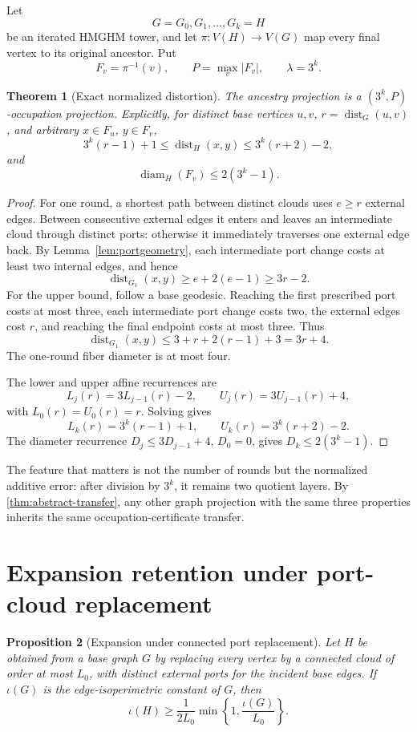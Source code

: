 \documentclass[11pt]{amsart}
\newtheorem{theorem}{Theorem}[section]
\newtheorem{proposition}[theorem]{Proposition}
\theoremstyle{definition}
\newcommand{\dist}{\operatorname{dist}}
\newcommand{\diam}{\operatorname{diam}}
\newcommand{\iotae}{\iota}
\begin{document}
Let
\[
 G=G_0,G_1,\ldots,G_k=H
\]
be an iterated HMGHM tower, and let $\pi:V(H)\to V(G)$ map every final vertex
to its original ancestor.  Put
\[
 F_v=\pi^{-1}(v),
 \qquad
 P=\max_v|F_v|,
 \qquad
 \lambda=3^k.
\]

\begin{theorem}[Exact normalized distortion]\label{thm:metric}
The ancestry projection is a $(3^k,P)$-occupation projection.  Explicitly,
for distinct base vertices $u,v$, $r=\dist_G(u,v)$, and arbitrary
$x\in F_u$, $y\in F_v$,
\[
 \boxed{
 3^k(r-1)+1
 \le
 \dist_H(x,y)
 \le
 3^k(r+2)-2,
 }
\]
and
\[
 \boxed{\diam_H(F_v)\le2(3^k-1).}
\]
\end{theorem}

\begin{proof}
For one round, a shortest path between distinct clouds uses $e\ge r$
external edges.  Between consecutive external edges it enters and leaves an
intermediate cloud through distinct ports: otherwise it immediately traverses
one external edge back.  By Lemma~\ref{lem:portgeometry}, each intermediate port
change costs at least two internal edges, and hence
\[
 \dist_{G_1}(x,y)\ge e+2(e-1)\ge3r-2.
\]
For the upper bound, follow a base geodesic.  Reaching the first prescribed
port costs at most three, each intermediate port change costs two, the
external edges cost $r$, and reaching the final endpoint costs at most three.
Thus
\[
 \dist_{G_1}(x,y)\le3+r+2(r-1)+3=3r+4.
\]
The one-round fiber diameter is at most four.

The lower and upper affine recurrences are
\[
 L_j(r)=3L_{j-1}(r)-2,
 \qquad
 U_j(r)=3U_{j-1}(r)+4,
\]
with $L_0(r)=U_0(r)=r$.  Solving gives
\[
 L_k(r)=3^k(r-1)+1,
 \qquad
 U_k(r)=3^k(r+2)-2.
\]
The diameter recurrence $D_j\le3D_{j-1}+4$, $D_0=0$, gives
$D_k\le2(3^k-1)$.
\end{proof}

The feature that matters is not the number of rounds but the normalized
additive error: after division by $3^k$, it remains two quotient layers.  By
\cref{thm:abstract-transfer}, any other graph projection with the same three
properties inherits the same occupation-certificate transfer.

\section{Expansion retention under port-cloud replacement}

\begin{proposition}[Expansion under connected port replacement]\label{prop:port-exp}
Let $H$ be obtained from a base graph $G$ by replacing every vertex by a
connected cloud of order at most $L_0$, with distinct external ports for the
incident base edges.  If $\iotae(G)$ is the edge-isoperimetric constant of
$G$, then
\[
 \boxed{
 \iotae(H)
 \ge
 \frac{1}{2L_0}
 \min\left\{1,\frac{\iotae(G)}{L_0}\right\}.
 }
\]
\end{proposition}
\end{document}
